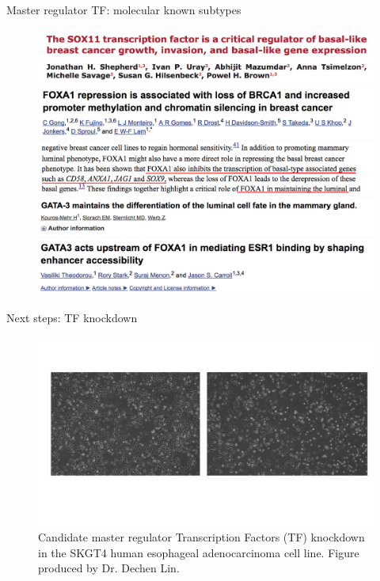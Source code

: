 \documentclass[slidestop,compress,11pt,xcolor=dvipsnames]{beamer}
\begin{document}
\begin{frame}{Master regulator TF: molecular known subtypes}

 \begin{figure}[ht!]
  \centering
  \includegraphics[width=1.0\textwidth]{ELMER/SOX11_basal.png}
  \includegraphics[width=1.0\textwidth]{ELMER/SOX9_2.png}
  \includegraphics[width=1.0\textwidth]{ELMER/SOX9_1.png}
  \includegraphics[width=1.0\textwidth]{ELMER/GATA3.png}
  \includegraphics[width=1.0\textwidth]{ELMER/cofactors.png}
     \end{figure}
\end{frame}

\begin{frame}{Next steps: TF knockdown}
 \begin{figure}[ht!]
  \centering
  \includegraphics[width=1.0\textwidth]{glioma/knockdown_TF_ESCA.pdf}
  \caption{Candidate master regulator Transcription Factors (TF) knockdown in the SKGT4 human esophageal adenocarcinoma cell line. Figure produced by Dr. Dechen Lin.}
 \end{figure}
\end{frame}
\end{document}
